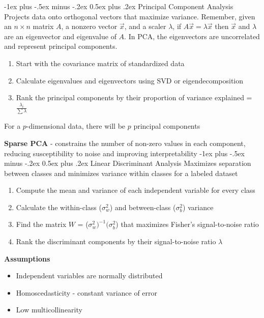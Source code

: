 \documentclass[10pt,landscape]{article}
\makeatletter
\renewcommand{\subsection}{\@startsection{subsection}{2}{0mm}%
                                {-1ex plus -.5ex minus -.2ex}%
                                {0.5ex plus .2ex}%
                                {\normalfont\normalsize\bfseries}}
\makeatother
\begin{document}
\begin{multicols}{3}
\subsection{Principal Component Analysis}
Projects data onto orthogonal vectors that maximize variance.
Remember, given an $n\times n$ matrix $A$, a nonzero vector $\vec{x}$, and a scaler $\lambda$, if $A\vec{x} = \lambda \vec{x}$ then $\vec{x}$ and $\lambda$ are an eigenvector and eigenvalue of $A$. In PCA, the eigenvectors are uncorrelated and represent principal components.
\begin{enumerate}[leftmargin=5mm]
\itemsep -.4mm 
\item Start with the covariance matrix of standardized data
\item Calculate eigenvalues and eigenvectors using SVD or eigendecomposition
\item Rank the principal components by their proportion of variance explained = $\frac{\lambda_i}{\sum{\lambda}}$
\end{enumerate}

For a $p$-dimensional data, there will be $p$ principal components

\textbf{Sparse PCA} - constrains the number of non-zero values in each component, reducing susceptibility to noise and improving interpretability
\subsection{Linear Discriminant Analysis}
Maximizes separation between classes and minimizes variance within classes for a labeled dataset
\begin{enumerate}[leftmargin=5mm]
\itemsep -.4mm 
\item Compute the mean and variance of each independent variable for every class
\item Calculate the within-class ($\sigma_w^2$) and between-class ($\sigma_b^2$) variance
\item Find the matrix $W$ = ($\sigma_w^2)^{-1}(\sigma_b^2$) that maximizes Fisher's signal-to-noise ratio
\item Rank the discriminant components by their signal-to-noise ratio $\lambda$
\end{enumerate}
\textbf{Assumptions}

\begin{itemize}[label={--},leftmargin=4mm]
\itemsep -.4mm 
\item Independent variables are normally distributed
\item Homoscedasticity - constant variance of error
\item Low multicollinearity
\end{itemize}


\end{multicols}
\end{document}
